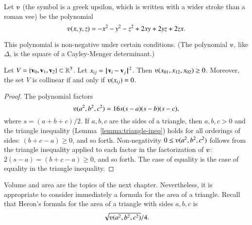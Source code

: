 \begin{definition}[$\ups$]\label{def:ups}
Let $\ups$ (the symbol is a greek upsilon, which is written with a
wider stroke than a roman vee) be the polynomial
\begin{displaymath}\ups(x,y,z) = -x^2 - y^2 - z^2 + 2 x y + 2 y z + 2
  z x.\end{displaymath}
%
\end{definition}



This polynomial is non-negative under certain conditions. (The polynomial
$\ups$, like $\Delta$, 
is the square of a Cayley-Menger determinant.)  


\begin{lemma}[]\label{lemma:ups} Let
  $V=\{{\mathbf v}_0,{\mathbf v}_1,{\mathbf v}_2\}\subset\mathbb{R}^3$.  Let $x_{ij} =
  \norm{\v_i}{\v_j}^2$.  Then $\ups(x_{01},x_{12},x_{02})\ge 0$.
  Moreover, the set $V$ is collinear if and only if $\ups(x_{ij}) =
  0$.%
\end{lemma}

\begin{proof}
The polynomial factors
\begin{equation}\label{eqn:ups}
\ups(a^2,b^2,c^2) = 16 s (s-a) (s-b)
  (s-c),
\end{equation}
where $s = (a+b+c)/2$.  If $a,b,c$ are the sides of a triangle, then
$a,b,c>0$ and the triangle inequality (Lemma~\ref{lemma:triangle-ineq})
holds for all orderings of sides: $(b+c-a)\ge 0$, and so forth.
Non-negativity $0\le \ups(a^2,b^2,c^2)$ follows from the triangle
inequality applied to each factor in the factorization of $\ups$:
$2(s-a) = (b+c-a) \ge0$, and so forth.  The case of equality is the
case of equality in the triangle inequality.
%
%
\end{proof}


%
Volume and area are the topics of the next chapter.  Nevertheless, it
is appropriate to consider immediately a formula for the area of a
triangle.  Recall that Heron's formula for the area of a triangle with
sides $a,b,c$
is \begin{displaymath}\sqrt{\ups(a^2,b^2,c^2)}/4.\end{displaymath}

